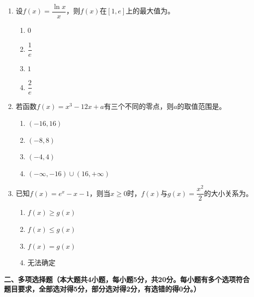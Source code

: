 \documentclass[12pt, a4paper]{ctexart}
\newcommand{\blank}[1]{\underline{\hspace{#1}}}
\begin{document}
\begin{enumerate}
\item 设$f(x)=\dfrac{\ln x}{x}$，则$f(x)$在$[1,e]$上的最大值为\blank{3cm}。
\begin{enumerate}[label=\Alph*.]
\item $0$
\item $\dfrac{1}{e}$
\item $1$
\item $\dfrac{2}{e}$
\end{enumerate}

\item 若函数$f(x)=x^3-12x+a$有三个不同的零点，则$a$的取值范围是\blank{3cm}。
\begin{enumerate}[label=\Alph*.]
\item $(-16,16)$
\item $(-8,8)$
\item $(-4,4)$
\item $(-\infty,-16)\cup(16,+\infty)$
\end{enumerate}

\item 已知$f(x)=e^x-x-1$，则当$x\geq 0$时，$f(x)$与$g(x)=\dfrac{x^2}{2}$的大小关系为\blank{3cm}。
\begin{enumerate}[label=\Alph*.]
\item $f(x)\geq g(x)$
\item $f(x)\leq g(x)$
\item $f(x)=g(x)$
\item 无法确定
\end{enumerate}
\end{enumerate}

\vspace{1em}

\noindent\textbf{二、多项选择题（本大题共4小题，每小题5分，共20分。每小题有多个选项符合题目要求，全部选对得5分，部分选对得2分，有选错的得0分。）}
\end{document}
